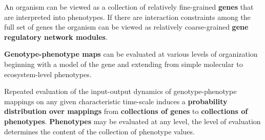\begin{frame}
\begin{block}{}
An organism can be viewed as a collection of relatively fine-grained \textbf{genes} that are interpreted into phenotypes. If there are interaction constraints among the full set of genes the organism can be viewed as relatively coarse-grained \textbf{gene regulatory network modules}. 
\end{block}
\begin{block}{}
\textbf{Genotype-phenotype maps} can be evaluated at various levels of organization  beginning with a model of the gene and extending from simple molecular to ecosystem-level phenotypes.
\end{block}
\begin{block}{}
Repeated evaluation of the input-output dynamics of genotype-phenotype mappings on any given characteristic time-scale induces a \textbf{probability distribution over mappings} from \textbf{collections of genes} to \textbf{collections of phenotypes}. \textbf{Phenotypes} may be evaluated at any level, the level of evaluation determines the content of the collection of phenotype values.
\end{block}
\end{frame}